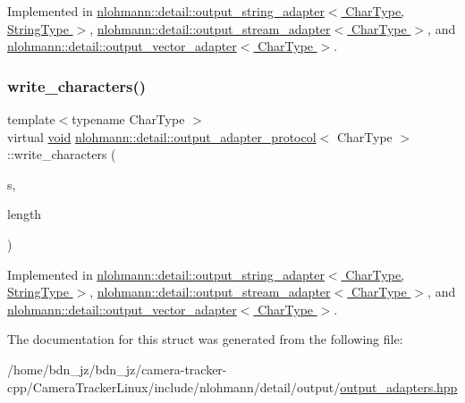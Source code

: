 Implemented in \hyperlink{classnlohmann_1_1detail_1_1output__string__adapter_a2d76cc6c88ddbc196a63fcfcac9ee7d1}{nlohmann\+::detail\+::output\+\_\+string\+\_\+adapter$<$ Char\+Type, String\+Type $>$}, \hyperlink{classnlohmann_1_1detail_1_1output__stream__adapter_a6e2698c76b200b2d8fac6cebfc43a245}{nlohmann\+::detail\+::output\+\_\+stream\+\_\+adapter$<$ Char\+Type $>$}, and \hyperlink{classnlohmann_1_1detail_1_1output__vector__adapter_af6a22d4210bb7bc2da66021300ddd6db}{nlohmann\+::detail\+::output\+\_\+vector\+\_\+adapter$<$ Char\+Type $>$}.

\mbox{\label{structnlohmann_1_1detail_1_1output__adapter__protocol_a2f410a164e0eda17cf6561114b0eee4a}} 
\subsubsection{\texorpdfstring{write\+\_\+characters()}{write\_characters()}}
{\footnotesize\ttfamily template$<$typename Char\+Type $>$ \\
virtual \hyperlink{namespacenlohmann_1_1detail_a59fca69799f6b9e366710cb9043aa77d}{void} \hyperlink{structnlohmann_1_1detail_1_1output__adapter__protocol}{nlohmann\+::detail\+::output\+\_\+adapter\+\_\+protocol}$<$ Char\+Type $>$\+::write\+\_\+characters (\begin{DoxyParamCaption}\item[{const Char\+Type $\ast$}]{s,  }\item[{std\+::size\+\_\+t}]{length }\end{DoxyParamCaption})\hspace{0.3cm}{\ttfamily [pure virtual]}}



Implemented in \hyperlink{classnlohmann_1_1detail_1_1output__string__adapter_ab5ea4da075305d225dfd84ad997e8747}{nlohmann\+::detail\+::output\+\_\+string\+\_\+adapter$<$ Char\+Type, String\+Type $>$}, \hyperlink{classnlohmann_1_1detail_1_1output__stream__adapter_ad61375497a7d03cb0bdcddfdaad185d0}{nlohmann\+::detail\+::output\+\_\+stream\+\_\+adapter$<$ Char\+Type $>$}, and \hyperlink{classnlohmann_1_1detail_1_1output__vector__adapter_ad6f6c461dec7bedd5359454dc22fc9aa}{nlohmann\+::detail\+::output\+\_\+vector\+\_\+adapter$<$ Char\+Type $>$}.



The documentation for this struct was generated from the following file\+:\begin{DoxyCompactItemize}
\item 
/home/bdn\+\_\+jz/bdn\+\_\+jz/camera-\/tracker-\/cpp/\+Camera\+Tracker\+Linux/include/nlohmann/detail/output/\hyperlink{output__adapters_8hpp}{output\+\_\+adapters.\+hpp}\end{DoxyCompactItemize}
